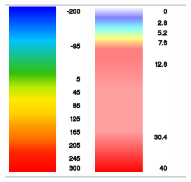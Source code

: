 \begin{maxipage}
\begin{longtable}{c c c}
\includegraphics[angle=0,width=3.5cm,keepaspectratio='true']{figures/ramp-rasp-vertspeed.png}&
\includegraphics[angle=0,width=3.5cm,keepaspectratio='true']{figures/ramp-rasp-windspeed.png}& \\

\end{longtable}
\end{maxipage}

